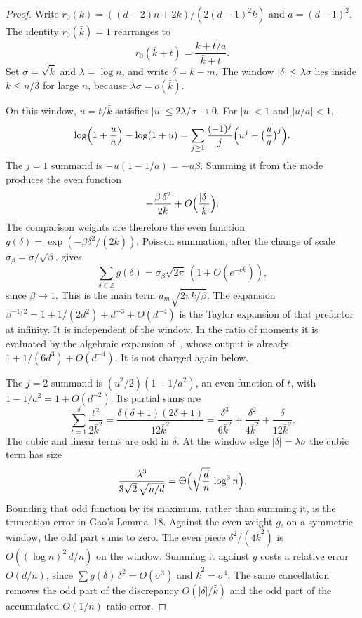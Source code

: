 \documentclass[11pt]{article}
\begin{document}
\begin{proof}
Write \(r_0(k)=((d-2)n+2k)/(2(d-1)^2 k)\) and \(a=(d-1)^2\). The identity \(r_0(\bar k)=1\) rearranges to
\[
r_0(\bar k+t)
=
\frac{\bar k+t/a}{\bar k+t}.
\]
Set \(\sigma=\sqrt{\bar k}\) and \(\lambda=\log n\), and write \(\delta=k-m\).
The window \(|\delta|\le\lambda\sigma\) lies inside \(k\le n/3\) for large \(n\), because
\(\lambda\sigma=o(\bar k)\).

On this window, \(u=t/\bar k\) satisfies \(|u|\le 2\lambda/\sigma\to 0\). For \(|u|<1\) and \(|u/a|<1\),
\[
\log\Bigl(1+\frac{u}{a}\Bigr)-\log(1+u)
=
\sum_{j\ge 1}\frac{(-1)^j}{j}\Bigl(u^j-\bigl(\frac{u}{a}\bigr)^j\Bigr).
\]
The \(j=1\) summand is \(-u(1-1/a)=-u\beta\). Summing it from the mode produces the even function
\[
-\frac{\beta\,\delta^2}{2\bar k}+O\Bigl(\frac{|\delta|}{\bar k}\Bigr).
\]
The comparison weights are therefore the even function
\(g(\delta)=\exp(-\beta\delta^2/(2\bar k))\).
Poisson summation, after the change of scale \(\sigma_\beta=\sigma/\sqrt{\beta}\), gives
\[
\sum_{\delta\in\mathbb{Z}}g(\delta)
=
\sigma_\beta\sqrt{2\pi}\,(1+O(e^{-c\bar k})),
\]
since \(\beta\to 1\). This is the main term \(a_m\sqrt{2\pi\bar k/\beta}\).
The expansion \(\beta^{-1/2}=1+1/(2d^2)+d^{-3}+O(d^{-4})\) is the Taylor expansion of that
prefactor at infinity. It is independent of the window. In the ratio of moments it is evaluated
by the algebraic expansion of~\cite[§3.4.1]{Gao21}, whose output is already
\(1+1/(6d^3)+O(d^{-4})\). It is not charged again below.

The \(j=2\) summand is \((u^2/2)(1-1/a^2)\), an even function of \(t\), with \(1-1/a^2=1+O(d^{-2})\). Its partial sums are
\[
\sum_{t=1}^{\delta}\frac{t^2}{2\bar k^2}
=
\frac{\delta(\delta+1)(2\delta+1)}{12\bar k^2}
=
\frac{\delta^3}{6\bar k^2}+\frac{\delta^2}{4\bar k^2}+\frac{\delta}{12\bar k^2}.
\]
The cubic and linear terms are odd in \(\delta\). At the window edge \(|\delta|=\lambda\sigma\) the cubic term has size
\[
\frac{\lambda^3}{3\sqrt{2}\,\sqrt{n/d}}
=
\Theta\Bigl(\sqrt{\frac{d}{n}}\,\log^3 n\Bigr).
\]
Bounding that odd function by its maximum, rather than summing it, is the truncation error in
Gao's Lemma~18. Against the even weight \(g\), on a symmetric window, the odd part sums to zero.
The even piece \(\delta^2/(4\bar k^2)\) is \(O((\log n)^2\,d/n)\) on the window. Summing it against \(g\) costs a relative
error \(O(d/n)\), since \(\sum g(\delta)\,\delta^2=O(\sigma^3)\) and \(\bar k^2=\sigma^4\).
The same cancellation removes the odd part of the discrepancy \(O(|\delta|/\bar k)\)
and the odd part of the accumulated \(O(1/n)\) ratio error.


\end{proof}
\end{document}
